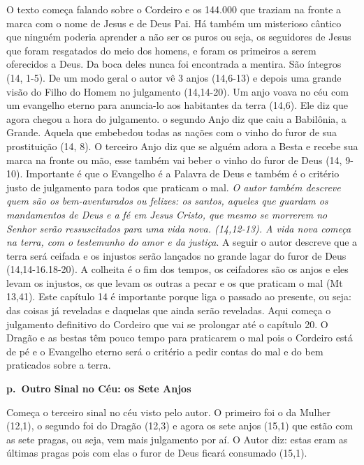 \documentclass[
]{book}
\begin{document}
O texto começa falando sobre o Cordeiro e os 144.000 que traziam na fronte a marca com o nome de Jesus e de Deus Pai. Há também um misterioso cântico que ninguém poderia aprender a não ser os puros ou seja, os seguidores de Jesus que foram resgatados do meio dos homens, e foram os primeiros a serem oferecidos a Deus. Da boca deles nunca foi encontrada a mentira. São íntegros (14, 1-5). De um modo geral o autor vê 3 anjos (14,6-13) e depois uma grande visão do Filho do Homem no julgamento (14,14-20). Um anjo voava no céu com um evangelho eterno para anuncia-lo aos habitantes da terra (14,6). Ele diz que agora chegou a hora do julgamento. o segundo Anjo diz que caiu a Babilônia, a Grande. Aquela que embebedou todas as nações com o vinho do furor de sua prostituição (14, 8). O terceiro Anjo diz que se alguém adora a Besta e recebe sua marca na fronte ou mão, esse também vai beber o vinho do furor de Deus (14, 9-10). Importante é que o Evangelho é a Palavra de Deus e também é o critério justo de julgamento para todos que praticam o mal. \emph{O autor também descreve quem são os bem-aventurados ou felizes: os santos, aqueles que guardam os mandamentos de Deus e a fé em Jesus Cristo, que mesmo se morrerem no Senhor serão ressuscitados para uma vida nova. (14,12-13). A vida nova começa na terra, com o testemunho do amor e da justiça}. A seguir o autor descreve que a terra será ceifada e os injustos serão lançados no grande lagar do furor de Deus (14,14-16.18-20). A colheita é o fim dos tempos, os ceifadores são os anjos e eles levam os injustos, os que levam os outras a pecar e os que praticam o mal (Mt 13,41). Este capítulo 14 é importante porque liga o passado ao presente, ou seja: das coisas já reveladas e daquelas que ainda serão reveladas. Aqui começa o julgamento definitivo do Cordeiro que vai se prolongar até o capítulo 20. O Dragão e as bestas têm pouco tempo para praticarem o mal pois o Cordeiro está de pé e o Evangelho eterno será o critério a pedir contas do mal e do bem praticados sobre a terra.

\textbf{p.~Outro Sinal no Céu: os Sete Anjos}

Começa o terceiro sinal no céu visto pelo autor. O primeiro foi o da Mulher (12,1), o segundo foi do Dragão (12,3) e agora os sete anjos (15,1) que estão com as sete pragas, ou seja, vem mais julgamento por aí. O Autor diz: estas eram as últimas pragas pois com elas o furor de Deus ficará consumado (15,1).
\end{document}
